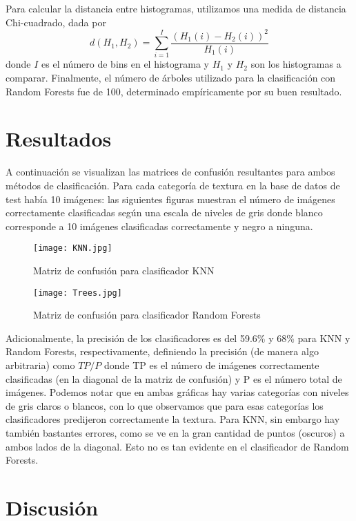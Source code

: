 \documentclass[10pt,twocolumn,letterpaper]{article}
\begin{document}
Para calcular la distancia entre histogramas, utilizamos una medida de distancia Chi-cuadrado, dada por
$$
d(H_1,H_2) = \sum_{i=1}^I \frac{(H_1(i)-H_2(i))^2}{H_1(i)}
$$
donde $I$ es el número de bins en el histograma y $H_1$ y $H_2$ son los histogramas a comparar. 
Finalmente, el número de árboles utilizado para la clasificación con Random Forests fue de 100, determinado empíricamente por su buen resultado.

\section{Resultados}

A continuación se visualizan las matrices de confusión resultantes para ambos métodos de clasificación. Para cada categoría de textura en la base de datos de test había 10 imágenes: las siguientes figuras muestran el número de imágenes correctamente clasificadas según una escala de niveles de gris donde blanco corresponde a 10 imágenes clasificadas correctamente y negro a ninguna. 
\begin{figure}[H]
\centering
\texttt{[image: KNN.jpg]}
\caption{Matriz de confusión para clasificador KNN}
\end{figure}

\begin{figure}[H]
\centering
\texttt{[image: Trees.jpg]}
\caption{Matriz de confusión para clasificador Random Forests}
\end{figure}

Adicionalmente, la precisión de los clasificadores es del 59.6\% y 68\% para KNN y Random Forests, respectivamente, definiendo la precisión (de manera algo arbitraria) como $TP/P$ donde TP es el número de imágenes correctamente clasificadas (en la diagonal de la matriz de confusión) y P es el número total de imágenes. Podemos notar que en ambas gráficas hay varias categorías con niveles de gris claros o blancos, con lo que observamos que para esas categorías los clasificadores predijeron correctamente la textura. Para KNN, sin embargo hay también bastantes errores, como se ve en la gran cantidad de puntos (oscuros) a ambos lados de la diagonal. Esto no es tan evidente en el clasificador de Random Forests. 


\section{Discusión}
\end{document}
